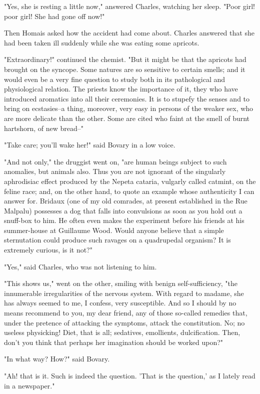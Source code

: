 \documentclass{tufte-book}
\begin{document}
"Yes, she is resting a little now," answered Charles, watching her
sleep. "Poor girl! poor girl! She had gone off now!"

Then Homais asked how the accident had come about. Charles answered that
she had been taken ill suddenly while she was eating some apricots.

"Extraordinary!" continued the chemist. "But it might be that the
apricots had brought on the syncope. Some natures are so sensitive to
certain smells; and it would even be a very fine question to study both
in its pathological and physiological relation. The priests know the
importance of it, they who have introduced aromatics into all their
ceremonies. It is to stupefy the senses and to bring on ecstasies--a
thing, moreover, very easy in persons of the weaker sex, who are more
delicate than the other. Some are cited who faint at the smell of burnt
hartshorn, of new bread--"

"Take care; you'll wake her!" said Bovary in a low voice.

"And not only," the druggist went on, "are human beings subject to such
anomalies, but animals also. Thus you are not ignorant of the singularly
aphrodisiac effect produced by the Nepeta cataria, vulgarly called
catmint, on the feline race; and, on the other hand, to quote an example
whose authenticity I can answer for. Bridaux (one of my old comrades, at
present established in the Rue Malpalu) possesses a dog that falls into
convulsions as soon as you hold out a snuff-box to him. He often even
makes the experiment before his friends at his summer-house at Guillaume
Wood. Would anyone believe that a simple sternutation could produce such
ravages on a quadrupedal organism? It is extremely curious, is it not?"

"Yes," said Charles, who was not listening to him.

"This shows us," went on the other, smiling with benign
self-sufficiency, "the innumerable irregularities of the nervous system.
With regard to madame, she has always seemed to me, I confess, very
susceptible. And so I should by no means recommend to you, my dear
friend, any of those so-called remedies that, under the pretence
of attacking the symptoms, attack the constitution. No; no useless
physicking! Diet, that is all; sedatives, emollients, dulcification.
Then, don't you think that perhaps her imagination should be worked
upon?"

"In what way? How?" said Bovary.

"Ah! that is it. Such is indeed the question. 'That is the question,' as
I lately read in a newspaper."
\end{document}
